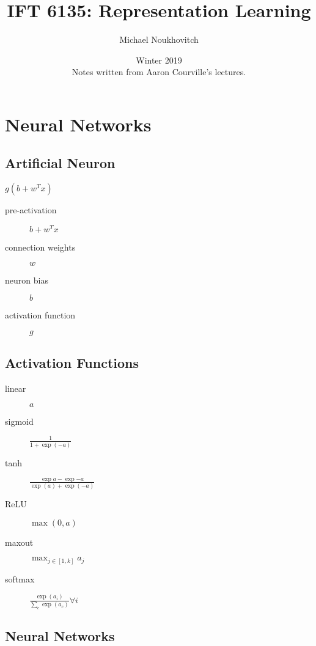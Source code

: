 \documentclass[]{article}
\begin{document}
\let\ref\Cref

\title{\bf{IFT 6135: Representation Learning}}
\date{Winter 2019 \\ \center Notes written from Aaron Courville's lectures.}
\author{Michael Noukhovitch}

\maketitle
\newpage
\tableofcontents
\newpage

\section{Neural Networks}%
\label{sec:neural_networks}

\subsection{Artificial Neuron}%
\label{sub:artificial_neuron}

$g(b + w^Tx)$
\begin{description}
    \item[pre-activation] $b + w^Tx$
    \item[connection weights] $w$
    \item[neuron bias] $b$
    \item[activation function] $g$
\end{description}

\subsection{Activation Functions}%
\label{sub:activation_functions}

\begin{description}
    \item[linear] $a$
    \item[sigmoid] $\frac{1}{1 + \exp(-a)}$
    \item[tanh] $\frac{\exp{a} - \exp{-a}}{\exp(a) + \exp(-a)}$
    \item[ReLU] $\max(0,a)$
    \item[maxout] $\max_{j \in [1,k]} a_j$
    \item[softmax] $\frac{\exp(a_i)}{\sum_c \exp(a_c)} \forall i$
\end{description}

\subsection{Neural Networks}%
\label{sub:single_layer_neural_network}
\end{document}
